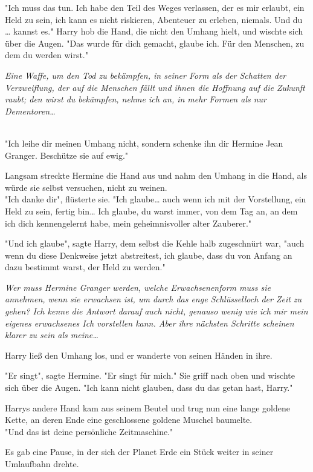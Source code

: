 {"Ich muss das tun. Ich habe den Teil des Weges verlassen, der es mir erlaubt, ein Held zu sein, ich kann es nicht riskieren, Abenteuer zu erleben, niemals. Und du … kannst es." Harry hob die Hand, die nicht den Umhang hielt, und wischte sich über die Augen. "Das wurde für dich gemacht, glaube ich. Für den Menschen, zu dem du werden wirst."

\emph{Eine Waffe, um den Tod zu bekämpfen, in seiner Form als der Schatten der Verzweiflung, der auf die Menschen fällt und ihnen die Hoffnung auf die Zukunft raubt; den wirst du bekämpfen, nehme ich an, in mehr Formen als nur Dementoren…\\ }\strut \\ "Ich leihe dir meinen Umhang nicht, sondern schenke ihn dir Hermine Jean Granger. Beschütze sie auf ewig."

Langsam streckte Hermine die Hand aus und nahm den Umhang in die Hand, als würde sie selbst versuchen, nicht zu weinen.\\ "Ich danke dir", flüsterte sie. "Ich glaube… auch wenn ich mit der Vorstellung, ein Held zu sein, fertig bin… Ich glaube, du warst immer, von dem Tag an, an dem ich dich kennengelernt habe, mein geheimnisvoller alter Zauberer."

"Und ich glaube", sagte Harry, dem selbst die Kehle halb zugeschnürt war, "auch wenn du diese Denkweise jetzt abstreitest, ich glaube, dass du von Anfang an dazu bestimmt warst, der Held zu werden."

\emph{Wer muss Hermine Granger werden, welche Erwachsenenform muss sie annehmen, wenn sie erwachsen ist, um durch das enge Schlüsselloch der Zeit zu gehen? Ich kenne die Antwort darauf auch nicht, genauso wenig wie ich mir mein eigenes erwachsenes Ich vorstellen kann. Aber ihre nächsten Schritte scheinen klarer zu sein als meine…}

Harry ließ den Umhang los, und er wanderte von seinen Händen in ihre.

"Er singt", sagte Hermine. "Er singt für mich." Sie griff nach oben und wischte sich über die Augen. "Ich kann nicht glauben, dass du das getan hast, Harry."

Harrys andere Hand kam aus seinem Beutel und trug nun eine lange goldene Kette, an deren Ende eine geschlossene goldene Muschel baumelte.\\ "Und das ist deine persönliche Zeitmaschine."

Es gab eine Pause, in der sich der Planet Erde ein Stück weiter in seiner Umlaufbahn drehte.

}
